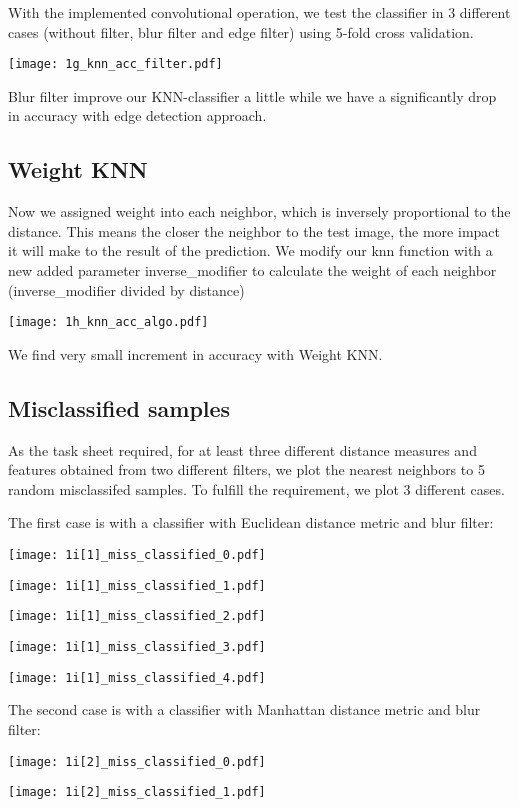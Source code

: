 \documentclass[11pt]{article}
\begin{document}
With the implemented convolutional operation, we test the classifier in 3 different cases (without filter, blur filter and edge filter) using 5-fold cross validation.

\texttt{[image: 1g\_knn\_acc\_filter.pdf]}

Blur filter improve our KNN-classifier a little while we have a significantly drop in accuracy with edge detection approach.


\subsection{Weight KNN}

Now we assigned weight into each neighbor, which is inversely proportional to the distance. This means the closer the neighbor to the test image, the more impact it will make to the result of the prediction. We modify our knn function with a new added parameter inverse\_modifier to calculate the weight of each neighbor (inverse\_modifier divided by distance)

\texttt{[image: 1h\_knn\_acc\_algo.pdf]}

We find very small increment in accuracy with Weight KNN.

\subsection{Misclassified samples}

As the task sheet required, for at least three different distance measures and features obtained from two different filters, we plot the nearest neighbors to 5 random misclassifed samples. To fulfill the requirement, we plot 3 different cases.

The first case is with a classifier with Euclidean distance metric and blur filter:

\texttt{[image: 1i[1]\_miss\_classified\_0.pdf]}

\texttt{[image: 1i[1]\_miss\_classified\_1.pdf]}

\texttt{[image: 1i[1]\_miss\_classified\_2.pdf]}

\texttt{[image: 1i[1]\_miss\_classified\_3.pdf]}

\texttt{[image: 1i[1]\_miss\_classified\_4.pdf]}

The second case is with a classifier with Manhattan distance metric and blur filter:

\texttt{[image: 1i[2]\_miss\_classified\_0.pdf]}

\texttt{[image: 1i[2]\_miss\_classified\_1.pdf]}
\end{document}
